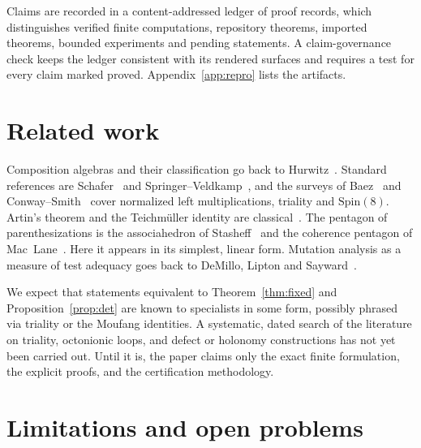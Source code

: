 \documentclass[11pt]{amsart}
\theoremstyle{definition}
\theoremstyle{remark}
\begin{document}
Claims are recorded in a content-addressed ledger of proof records, which
distinguishes verified finite computations, repository theorems, imported
theorems, bounded experiments and pending statements. A claim-governance
check keeps the ledger consistent with its rendered surfaces and requires a
test for every claim marked proved. Appendix~\ref{app:repro} lists the
artifacts.

\section{Related work}\label{sec:related}

Composition algebras and their classification go back to
Hurwitz~\cite{hurwitz1898}. Standard references are Schafer~\cite{schafer1966}
and Springer--Veldkamp~\cite{springer2000}, and the surveys of
Baez~\cite{baez2002} and Conway--Smith~\cite{conway2003} cover normalized left
multiplications, triality and $\mathrm{Spin}(8)$. Artin's theorem and the
Teichm\"uller identity are classical~\cite{schafer1966,zhevlakov1982}. The
pentagon of parenthesizations is the associahedron of
Stasheff~\cite{stasheff1963} and the coherence pentagon of
Mac~Lane~\cite{maclane1963}. Here it appears in its simplest, linear form.
Mutation analysis as a measure of test adequacy goes back to DeMillo, Lipton
and Sayward~\cite{demillo1978}.

We expect that statements equivalent to Theorem~\ref{thm:fixed} and
Proposition~\ref{prop:det} are known to specialists in some form, possibly
phrased via triality or the Moufang identities. A systematic, dated search of
the literature on triality, octonionic loops, and defect or holonomy
constructions has not yet been carried out. Until it is, the paper claims
only the exact finite formulation, the explicit proofs, and the certification
methodology.

\section{Limitations and open problems}\label{sec:open}
\end{document}
